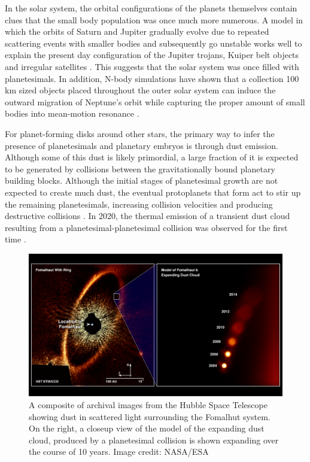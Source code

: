 In the solar system, the orbital configurations of the planets themselves contain clues that the small body population was once much more numerous. A model in which the orbits of Saturn and Jupiter gradually evolve due to repeated scattering events with smaller bodies and subsequently go unstable works well to explain the present day configuration of the Jupiter trojans, Kuiper belt objects and irregular satellites \cite{gomes05, tsiganis05, morbidelli05,}. This suggests that the solar system was once filled with planetesimals. In addition, N-body simulations have shown that a collection 100 km sized objects placed throughout the outer solar system can induce the outward migration of Neptune's orbit while capturing the proper amount of small bodies into mean-motion resonance \cite{murrayclay06}.

For planet-forming disks around other stars, the primary way to infer the presence of planetesimals and planetary embryos is through dust emission. Although some of this dust is likely primordial, a large fraction of it is expected to be generated by collisions between the gravitationally bound planetary building blocks. Although the initial stages of planetesimal growth are not expected to create much dust, the eventual protoplanets that form act to stir up the remaining planetesimals, increasing collision velocities and producing destructive collisions \cite{kenyon04}. In 2020, the thermal emission of a transient dust cloud resulting from a planetesimal-planetesimal collision was observed for the first time \cite{gaspar20}.

\begin{figure}
\begin{center}
    \includegraphics[width=\textwidth]{figures/intro/fomalhutb.png}
    \caption{A composite of archival images from the Hubble Space Telescope showing dust in scattered light surrounding the Fomalhut system. On the right, a closeup view of the model of the expanding dust cloud, produced by a planetesimal collision is shown expanding over the course of 10 years. Image credit: NASA/ESA\label{fig:fomalhutb}}
\end{center}
\end{figure}

